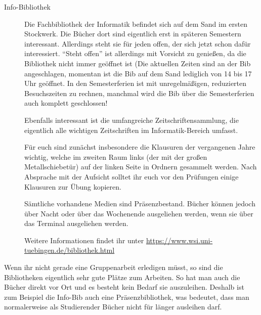 \begin{description}
	\item[Info-Bibliothek]
	Die Fachbibliothek der Informatik befindet sich auf dem Sand
	im ersten Stockwerk.  Die Bücher dort sind eigentlich erst in
	späteren Semestern interessant.  Aller\-dings steht sie für jeden
	offen, der sich jetzt schon dafür interessiert.  "`Steht
	offen"' ist allerdings mit Vorsicht zu genießen, da die
	Bibliothek nicht immer geöffnet ist (Die aktuellen Zeiten
	sind an der Bib angeschlagen, %
	momentan ist die Bib auf dem Sand lediglich von 14 bis 17 Uhr geöffnet.
	In den Semesterferien ist mit unregelmäßigen, reduzierten Besuchszeiten zu rechnen, manchmal wird die Bib über die Semesterferien auch komplett geschlossen!
	
	Ebenfalls interessant ist die umfangreiche Zeitschriftensammlung,
	die eigentlich alle wichtigen Zeitschriften im
	Informatik-Bereich umfasst.
	
	Für euch sind zunächst insbesondere die Klausuren der
	vergangenen Jahre wichtig, welche im zweiten Raum links (der mit
	der großen Metallschiebetür) auf der linken Seite in Ordnern gesammelt
	werden.  Nach Absprache mit der Aufsicht solltet ihr euch vor den
	Prüfungen einige Klausuren zur Übung kopieren.
	
	Sämtliche vorhandene Medien sind Präsenzbestand. Bücher können
	jedoch über Nacht oder über das Wochenende ausgeliehen werden, wenn sie über das Terminal ausgeliehen werden.
	
	Weitere Informationen findet ihr unter \url{https://www.wsi.uni-tuebingen.de/bibliothek.html}	%
	
\end{description}

Wenn ihr nicht gerade eine Gruppenarbeit erledigen müsst, so sind die
Bibliotheken eigentlich sehr gute Plätze zum Arbeiten.  So hat man
auch die Bücher direkt vor Ort und es besteht kein Bedarf sie
auszuleihen.  Deshalb ist zum Beispiel die Info-Bib auch eine
Präsenzbibliothek, was bedeutet, dass man normalerweise als
Studierender Bücher nicht für länger ausleihen darf.

